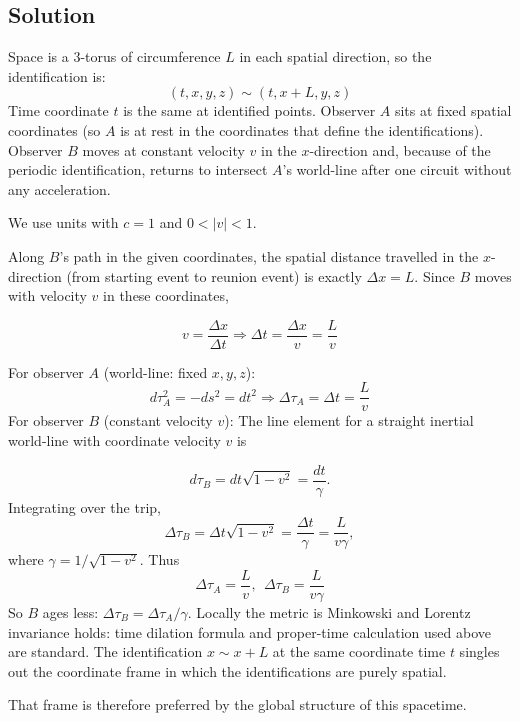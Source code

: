 \documentclass[10pt,twocoloumn]{article}
\newcommand{\addsvg}[4][1.0]{
    \begin{figure}[H]
        \centering
        
        \caption{#4}
        \label{fig:#3}
    \end{figure}
}
\begin{document}
\subsection*{Solution}
Space is a $3$-torus of circumference $L$ in each spatial direction, so the identification is:
\begin{equation}
(t,x,y,z)\sim (t,x+L,y,z)
\end{equation}
Time coordinate $t$ is the same at identified points.
Observer $A$ sits at fixed spatial coordinates (so $A$ is at rest in the coordinates that define the identifications). Observer $B$ moves at constant velocity $v$ in the $x$-direction and, because of the periodic identification, returns to intersect $A$'s world-line after one circuit without any acceleration.

We use units with $c=1$ and $0< |v| < 1$.

Along $B$'s path in the given coordinates, the spatial distance travelled in the $x$-direction (from starting event to reunion event) is exactly $\Delta x = L$. Since $B$ moves with velocity $v$ in these coordinates,

\begin{equation}
v = \frac{\Delta x}{\Delta t} \Rightarrow \Delta t = \frac{\Delta x}{v}=\frac{L}{v}
\end{equation}

For observer $A$ (world-line: fixed $x,y,z$):
\begin{equation}
d\tau_A^2 = -ds^2 = dt^2 \Rightarrow \Delta \tau_A = \Delta t = \frac{L}{v}
\end{equation}
For observer $B$ (constant velocity $v$):
The line element for a straight inertial world-line with coordinate velocity $v$ is
\addsvg[0.5]{./spacetime.svg}{spt}{}
\begin{equation}
d\tau_B = dt\sqrt{1-v^2}=\frac{dt}{\gamma}.
\end{equation}
Integrating over the trip,
\begin{equation}
\Delta \tau_B = \Delta t \sqrt{1-v^2}=\frac{\Delta t}{\gamma}=\frac{L}{v\gamma},
\end{equation}
where $\gamma=1/\sqrt{1-v^2}$. Thus
\begin{equation}
\boxed{\Delta \tau_A = \frac{L}{v},  \ \ \Delta\tau_B = \frac{L}{v\gamma}}
\end{equation}
So $B$ ages less: $\Delta\tau_B = \Delta\tau_A/\gamma$. Locally the metric is Minkowski and Lorentz invariance holds: time dilation formula and proper-time calculation used above are standard. The identification $x\sim x+L$ at the same coordinate time $t$ singles out the coordinate frame in which the identifications are purely spatial.
\addsvg[0.5]{./time-dialation.svg}{td}{}
That frame is therefore preferred by the global structure of this spacetime.
\end{document}
